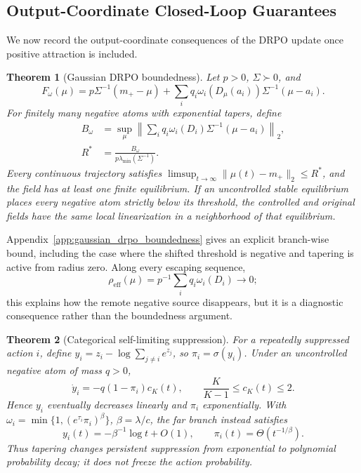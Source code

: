 \documentclass{article}
\theoremstyle{plain}
\newtheorem{theorem}{Theorem}[section]
\theoremstyle{definition}
\theoremstyle{remark}
\begin{document}
\subsection{Output-Coordinate Closed-Loop Guarantees}

We now record the output-coordinate consequences of the DRPO update once
positive attraction is included.

\begin{theorem}[Gaussian DRPO boundedness]
\label{thm:gaussian_drpo_boundedness}
Let \(p>0\), \(\Sigma\succ0\), and
\[
F_\omega(\mu)=p\Sigma^{-1}(m_+-\mu)
+\sum_iq_i\omega_i(D_\mu(a_i))\Sigma^{-1}(\mu-a_i).
\]
For finitely many negative atoms with exponential tapers, define
\begin{equation}
\begin{aligned}
B_\omega&=\sup_\mu\left\|\sum_iq_i\omega_i(D_i)
\Sigma^{-1}(\mu-a_i)\right\|_2,\\
R^*&=\frac{B_\omega}{p\lambda_{\min}(\Sigma^{-1})}.
\end{aligned}
\label{eq:gaussian_bound_radius}
\end{equation}
Every continuous trajectory satisfies
\(\limsup_{t\to\infty}\|\mu(t)-m_+\|_2\le R^*\), and the field has at
least one finite equilibrium. If an uncontrolled stable equilibrium
places every negative atom strictly below its threshold, the controlled
and original fields have the same local linearization in a neighborhood of
that equilibrium.
\end{theorem}

Appendix~\ref{app:gaussian_drpo_boundedness} gives an explicit
branch-wise bound, including the case where the shifted threshold is
negative and tapering is active from radius zero. Along every escaping
sequence,
\[
\rho_{\mathrm{eff}}(\mu)
=
p^{-1}\sum_i q_i\omega_i(D_i)
\longrightarrow 0;
\]
this explains how the remote negative source disappears, but it is a
diagnostic consequence rather than the boundedness argument.

\begin{theorem}[Categorical self-limiting suppression]
\label{thm:categorical_self_limiting}
For a repeatedly suppressed action \(i\), define
\(y_i=z_i-\log\sum_{j\ne i}e^{z_j}\), so \(\pi_i=\sigma(y_i)\).
Under an uncontrolled negative atom of mass \(q>0\),
\[
\dot y_i=-q(1-\pi_i)c_K(t),
\qquad \frac K{K-1}\le c_K(t)\le2.
\]
Hence \(y_i\) eventually decreases linearly and \(\pi_i\) exponentially.
With \(\omega_i=\min\{1,(e^{\tau_i}\pi_i)^\beta\}\),
\(\beta=\lambda/c\), the far branch instead satisfies
\[
y_i(t)=-\beta^{-1}\log t+O(1),
\qquad \pi_i(t)=\Theta(t^{-1/\beta}).
\]
Thus tapering changes persistent suppression from exponential to
polynomial probability decay; it does not freeze the action probability.
\end{theorem}
\end{document}
